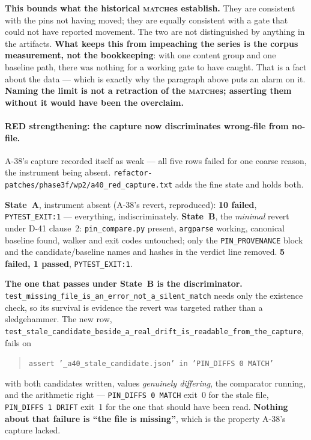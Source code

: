 \documentclass[
  10pt,
]{article}
\begin{document}
\textbf{This bounds what the historical \textsc{match}es establish.} They are consistent with the pins not having moved; they are equally consistent with a gate that could not have reported movement. The two are not distinguished by anything in the artifacts. \textbf{What keeps this from impeaching the series is the corpus measurement, not the bookkeeping}: with one content group and one baseline path, there was nothing for a working gate to have caught. That is a fact about the data --- which is exactly why the paragraph above puts an alarm on it. \textbf{Naming the limit is not a retraction of the \textsc{match}es; asserting them without it would have been the overclaim.}

\paragraph{RED strengthening: the capture now discriminates wrong-file from no-file.}
A-38's capture recorded itself as weak --- all five rows failed for one coarse reason, the instrument being absent. \texttt{refactor-patches/\allowbreak{}phase3f/wp2/\allowbreak{}a40\_red\_capture.txt} adds the fine state and holds both.

\textbf{State~A}, instrument absent (A-38's revert, reproduced): \textbf{10 failed}, \texttt{PYTEST\_EXIT:1} --- everything, indiscriminately. \textbf{State~B}, the \emph{minimal} revert under D-41 clause~2: \texttt{pin\_compare.py} present, \texttt{argparse} working, canonical baseline found, walker and exit codes untouched; only the \texttt{PIN\_PROVENANCE} block and the candidate/baseline names and hashes in the verdict line removed. \textbf{5 failed, 1 passed}, \texttt{PYTEST\_EXIT:1}.

\textbf{The one that passes under State~B is the discriminator.} \texttt{test\_missing\_file\_is\_an\_error\_not\_a\_silent\_match} needs only the existence check, so its survival is evidence the revert was targeted rather than a sledgehammer. The new row, \texttt{test\_stale\_candidate\_beside\_a\_real\_drift\_is\_readable\_from\_the\_capture}, fails on

\begin{quote}
\texttt{assert '\_a40\_stale\_candidate.json' in 'PIN\_DIFFS 0 MATCH'}
\end{quote}

with both candidates written, values \emph{genuinely differing}, the comparator running, and the arithmetic right --- \texttt{PIN\_DIFFS 0 MATCH} exit~0 for the stale file, \texttt{PIN\_DIFFS 1 DRIFT} exit~1 for the one that should have been read. \textbf{Nothing about that failure is ``the file is missing''}, which is the property A-38's capture lacked.
\end{document}
